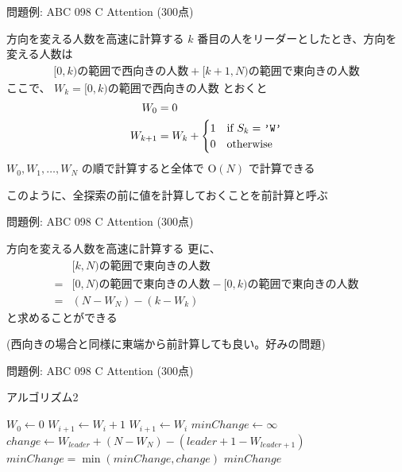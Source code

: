 \documentclass[dvipdfmx]{beamer}
\begin{document}
\begin{frame}{問題例: ABC 098 C Attention (300点)}
  \begin{block}{方向を変える人数を高速に計算する}
    $k$ 番目の人をリーダーとしたとき、方向を変える人数は
    \begin{align*}
      [0, k) \text{の範囲で西向きの人数} + [k+1, N) \text{の範囲で東向きの人数}
    \end{align*}
    ここで、 $W_k = [0, k) \text{の範囲で西向きの人数}$ とおくと
    \begin{align*}
      W_0 &= 0 \\
      W_{k+1} &= W_{k} +
      \begin{cases}
        1 & \text{if } S_{k} = \text{\texttt{'W'}} \\
        0 & \text{otherwise}
      \end{cases}
    \end{align*}
    $W_0, W_1, \ldots, W_N$ の順で計算すると全体で $\mathrm{O}(N)$ で計算できる

    このように、全探索の前に値を計算しておくことを前計算と呼ぶ
  \end{block}
\end{frame}

\begin{frame}{問題例: ABC 098 C Attention (300点)}
  \begin{block}{方向を変える人数を高速に計算する}
    更に、
    \begin{align*}
      & [k, N) \text{の範囲で東向きの人数} \\
      =& [0, N) \text{の範囲で東向きの人数} - [0, k) \text{の範囲で東向きの人数} \\
      =& \left(N - W_N\right) - \left(k - W_k\right)
    \end{align*}
    と求めることができる

    (西向きの場合と同様に東端から前計算しても良い。好みの問題)
  \end{block}
\end{frame}

\begin{frame}{問題例: ABC 098 C Attention (300点)}
  \begin{block}{アルゴリズム2}
    \begin{algorithmic}
      \STATE $W_0 \leftarrow 0$
      \STATE $W_{i+1} \leftarrow W_{i} + 1$
      \ELSE
      \STATE $W_{i+1} \leftarrow W_{i}$
      \ENDIF
      \ENDFOR
      \STATE $minChange \leftarrow \infty$
      \STATE $change \leftarrow W_{leader} + (N - W_N) - (leader + 1 - W_{leader + 1})$
      \STATE $minChange = \min(minChange, change)$
      \ENDFOR
      \RETURN $minChange$
    \end{algorithmic}
  \end{block}
\end{frame}
\end{document}
